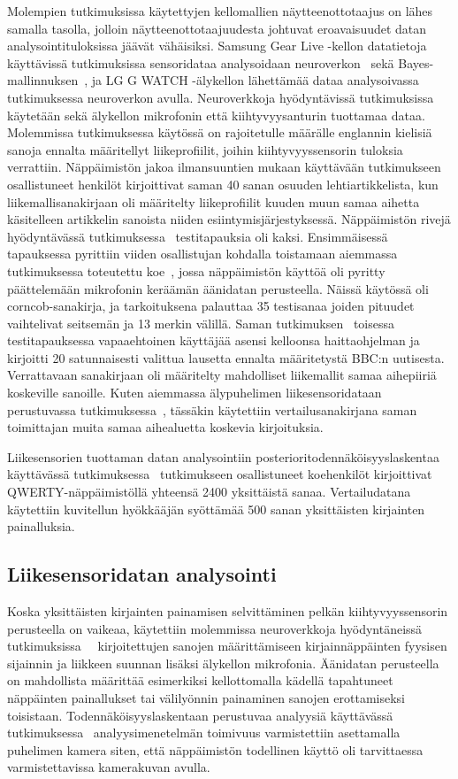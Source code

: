 \documentclass[finnish]{tktltiki2}
\theoremstyle{definition}
\theoremstyle{remark}
\begin{document}
Molempien tutkimuksissa käytettyjen kellomallien näytteenottotaajus on lähes samalla tasolla, jolloin näytteenottotaajuudesta johtuvat eroavaisuudet datan analysointituloksissa jäävät vähäisiksi. Samsung Gear Live -kellon datatietoja käyttävissä tutkimuksissa sensoridataa analysoidaan neuroverkon~\cite{maiti} sekä Bayes-mallinnuksen~\cite{mole}, ja LG G WATCH -älykellon lähettämää dataa analysoivassa tutkimuksessa neuroverkon avulla. Neuroverkkoja hyödyntävissä tutkimuksissa~\cite{maiti}~\cite{liu} käytetään sekä älykellon mikrofonin että kiihtyvyysanturin tuottamaa dataa. Molemmissa tutkimuksessa käytössä on rajoitetulle määrälle englannin kielisiä sanoja ennalta määritellyt liikeprofiilit, joihin kiihtyvyyssensorin tuloksia verrattiin. Näppäimistön jakoa ilmansuuntien mukaan käyttävään tutkimukseen~\cite{maiti} osallistuneet henkilöt kirjoittivat saman 40 sanan osuuden lehtiartikkelista, kun liikemallisanakirjaan oli määritelty liikeprofiilit kuuden muun samaa aihetta käsitelleen artikkelin sanoista niiden esiintymisjärjestyksessä.
Näppäimistön rivejä hyödyntävässä tutkimuksessa~\cite{liu} testitapauksia oli kaksi. Ensimmäisessä tapauksessa pyrittiin viiden osallistujan kohdalla toistamaan aiemmassa tutkimuksessa toteutettu koe~\cite{berger}, jossa näppäimistön käyttöä oli pyritty päättelemään mikrofonin keräämän äänidatan perusteella. Näissä käytössä oli corncob-sanakirja, ja tarkoituksena palauttaa 35 testisanaa joiden pituudet vaihtelivat seitsemän ja 13 merkin välillä. 
Saman tutkimuksen~\cite{liu} toisessa testitapauksessa vapaaehtoinen käyttäjää asensi kelloonsa haittaohjelman ja kirjoitti 20 satunnaisesti valittua lausetta ennalta määritetystä BBC:n uutisesta. Verrattavaan sanakirjaan oli määritelty mahdolliset liikemallit samaa aihepiiriä koskeville sanoille. Kuten aiemmassa älypuhelimen liikesensoridataan perustuvassa tutkimuksessa~\cite{mar}, tässäkin käytettiin vertailusanakirjana saman toimittajan muita samaa aihealuetta koskevia kirjoituksia. 

Liikesensorien tuottaman datan analysointiin posterioritodennäköisyyslaskentaa käyttävässä tutkimuksessa~\cite{mole} tutkimukseen osallistuneet koehenkilöt kirjoittivat QWERTY-näppäimistöllä yhteensä 2400 yksittäistä sanaa. Vertailudatana käytettiin kuvitellun hyökkääjän syöttämää 500 sanan yksittäisten kirjainten painalluksia.


\subsection{Liikesensoridatan analysointi}
Koska yksittäisten kirjainten painamisen selvittäminen pelkän kiihtyvyyssensorin perusteella on vaikeaa, käytettiin molemmissa neuroverkkoja hyödyntäneissä tutkimuksissa~\cite{maiti}~\cite{liu} kirjoitettujen sanojen määrittämiseen kirjainnäppäinten fyysisen sijainnin ja liikkeen suunnan lisäksi älykellon mikrofonia. Äänidatan perusteella on mahdollista määrittää esimerkiksi kellottomalla kädellä tapahtuneet näppäinten painallukset tai välilyönnin painaminen sanojen erottamiseksi toisistaan. Todennäköisyyslaskentaan perustuvaa analyysiä käyttävässä tutkimuksessa~\cite{mole} analyysimenetelmän toimivuus varmistettiin asettamalla puhelimen kamera siten, että näppäimistön todellinen käyttö oli tarvittaessa varmistettavissa kamerakuvan avulla.
\end{document}
